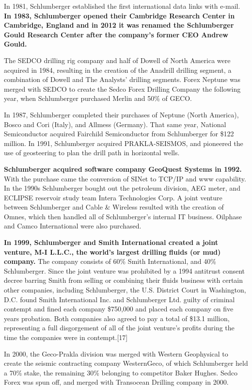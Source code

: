 \documentclass[12pt,a4paper]{report}
\begin{document}
In 1981, Schlumberger established the first international data links with
e-mail. \textbf{In 1983, Schlumberger opened their Cambridge Research Center
  in Cambridge, England and in 2012 it was renamed the Schlumberger Gould
  Research Center after the company's former CEO Andrew Gould.}

The SEDCO drilling rig company and half of Dowell of North America were
acquired in 1984, resulting in the creation of the Anadrill drilling
segment, a combination of Dowell and The Analysts' drilling segments. Forex
Neptune was merged with SEDCO to create the Sedco Forex Drilling Company the
following year, when Schlumberger purchased Merlin and 50\% of GECO.

In 1987, Schlumberger completed their purchases of Neptune (North America),
Bosco and Cori (Italy), and Allmess (Germany). That same year, National
Semiconductor acquired Fairchild Semiconductor from Schlumberger for \$122
million. In 1991, Schlumberger acquired PRAKLA-SEISMOS, and pioneered the
use of geosteering to plan the drill path in horizontal wells.

\textbf{Schlumberger acquired software company GeoQuest Systems in 1992.}
With the purchase came the conversion of SINet to TCP/IP and www capability.
In the 1990s Schlumberger bought out the petroleum division, AEG meter, and
ECLIPSE reservoir study team Intera Technologies Corp. A joint venture
between Schlumberger and Cable \& Wireless resulted with the creation of
Omnes, which then handled all of Schlumberger's internal IT business.
Oilphase and Camco International were also purchased.

\textbf{In 1999, Schlumberger and Smith International created a joint venture, M-I
L.L.C., the world's largest drilling fluids (or mud) company.} The company
consists of 60\% Smith International, and 40\% Schlumberger. Since the joint
venture was prohibited by a 1994 antitrust consent decree barring Smith from
selling or combining their fluids business with certain other companies,
including Schlumberger, the U.S. District Court in Washington, D.C. found
Smith International Inc. and Schlumberger Ltd. guilty of criminal contempt
and fined each company \$750,000 and placed each company on five years
probation. Both companies also agreed to pay a total of \$13.1 million,
representing a full disgorgement of all of the joint venture's profits
during the time the companies were in contempt.[17]

In 2000, the Geco-Prakla division was merged with Western Geophysical to
create the seismic contracting company WesternGeco, of which Schlumberger
held a 70\% stake, the remaining 30\% belonging to competitor Baker Hughes.
Sedco Forex was spun off, and merged with Transocean Drilling company in
2000.
\end{document}
